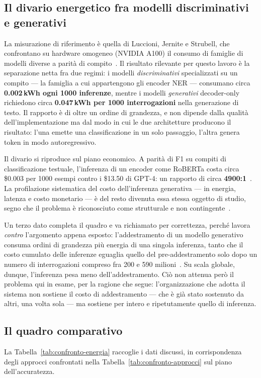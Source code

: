 \subsection{Il divario energetico fra modelli discriminativi e generativi}
La misurazione di riferimento è quella di Luccioni, Jernite e Strubell, che confrontano su hardware omogeneo (NVIDIA A100) il consumo di famiglie di modelli diverse a parità di compito~\cite{luccioni2024energy}. Il risultato rilevante per questo lavoro è la separazione netta fra due regimi: i modelli \textit{discriminativi} specializzati su un compito --- la famiglia a cui appartengono gli encoder NER --- consumano circa \textbf{0.002\,kWh ogni 1000 inferenze}, mentre i modelli \textit{generativi} decoder-only richiedono circa \textbf{0.047\,kWh per 1000 interrogazioni} nella generazione di testo. Il rapporto è di oltre un ordine di grandezza, e non dipende dalla qualità dell'implementazione ma dal modo in cui le due architetture producono il risultato: l'una emette una classificazione in un solo passaggio, l'altra genera token in modo autoregressivo. \medskip

Il divario si riproduce sul piano economico. A parità di F1 su compiti di classificazione testuale, l'inferenza di un encoder come RoBERTa costa circa \$0.003 per 1000 esempi contro i \$13.50 di GPT-4: un rapporto di circa \textbf{4900:1}~\cite{yuOpenClosedSmall2023}. La profilazione sistematica del costo dell'inferenza generativa --- in energia, latenza e costo monetario --- è del resto divenuta essa stessa oggetto di studio, segno che il problema è riconosciuto come strutturale e non contingente~\cite{husomPricePromptingProfiling2026}. \medskip

Un terzo dato completa il quadro e va richiamato per correttezza, perché lavora \emph{contro} l'argomento appena esposto: l'addestramento di un modello generativo consuma ordini di grandezza più energia di una singola inferenza, tanto che il costo cumulato delle inferenze eguaglia quello del pre-addestramento solo dopo un numero di interrogazioni compreso fra 200 e 590 milioni~\cite{luccioni2024energy}. Su scala globale, dunque, l'inferenza pesa meno dell'addestramento. Ciò non attenua però il problema qui in esame, per la ragione che segue: l'organizzazione che adotta il sistema non sostiene il costo di addestramento --- che è già stato sostenuto da altri, una volta sola --- ma sostiene per intero e ripetutamente quello di inferenza.

\subsection{Il quadro comparativo}
La Tabella~\ref{tab:confronto-energia} raccoglie i dati discussi, in corrispondenza degli approcci confrontati nella Tabella~\ref{tab:confronto-approcci} sul piano dell'accuratezza.

